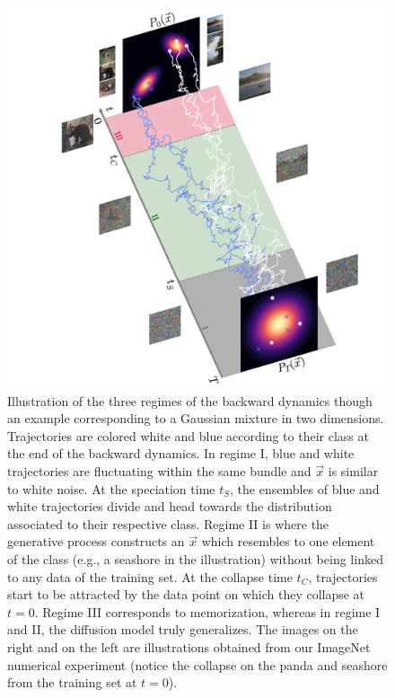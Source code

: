 \documentclass[10pt,twocolumn]{article}
\newcommand{\vx}{\vec x}
\begin{document}
\begin{figure}[!t]%
\centering
\includegraphics[width=1\linewidth]{Figures/Recap.pdf}
\caption{Illustration of the three regimes of the backward dynamics though an example corresponding to a Gaussian mixture in two dimensions. Trajectories are colored white and blue according to their class at the end of the backward dynamics. In regime I, blue and white trajectories are fluctuating within the same bundle and $\vx$ is similar to white noise. At the speciation time $t_S$, the ensembles of blue and white trajectories divide and head towards the distribution associated to their respective class. Regime II is where the generative process constructs an $\vx$ which resembles to one element of the class (e.g., a seashore in the illustration) without being linked to any data of the training set. At the collapse time $t_C$, trajectories start to be attracted by the  data point on which they collapse at $t=0$. Regime III corresponds to memorization, whereas in regime I and II, the diffusion model truly generalizes. The images on the right and on the left are illustrations obtained from our ImageNet numerical experiment (notice the collapse on the panda and seashore from the training set at $t=0$).
}
\label{fig:recap}
\end{figure}
\end{document}
